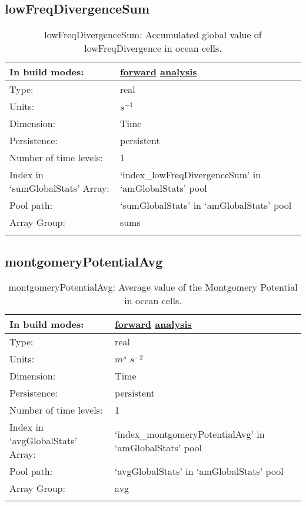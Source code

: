 \subsection[lowFreqDivergenceSum]{lowFreqDivergenceSum}
\label{subsec:var_sec_amGlobalStats_lowFreqDivergenceSum}
\begin{center}
\begin{longtable}{| p{2.0in} | p{4.0in} |}
        \hline 
        In build modes: & \hyperref[subsec:forward_var_tab_amGlobalStats]{forward} \hyperref[subsec:analysis_var_tab_amGlobalStats]{analysis} \\
        \hline 
        Type: & real \\
        \hline 
        Units: & $s^{-1}$ \\
        \hline 
        Dimension: & Time \\
        \hline 
        Persistence: & persistent \\
        \hline 
        Number of time levels: & 1 \\
        \hline 
		 Index in `sumGlobalStats' Array: & `index\_lowFreqDivergenceSum' in `amGlobalStats' pool \\
		 \hline 
            Pool path: & `sumGlobalStats' in `amGlobalStats' pool \\
		 \hline 
		 Array Group: & sums \\
		 \hline 
    \caption{lowFreqDivergenceSum: Accumulated global value of lowFreqDivergence in ocean cells.}
\end{longtable}
\end{center}
\subsection[montgomeryPotentialAvg]{montgomeryPotentialAvg}
\label{subsec:var_sec_amGlobalStats_montgomeryPotentialAvg}
\begin{center}
\begin{longtable}{| p{2.0in} | p{4.0in} |}
        \hline 
        In build modes: & \hyperref[subsec:forward_var_tab_amGlobalStats]{forward} \hyperref[subsec:analysis_var_tab_amGlobalStats]{analysis} \\
        \hline 
        Type: & real \\
        \hline 
        Units: & $m^s$ $s^{-2}$ \\
        \hline 
        Dimension: & Time \\
        \hline 
        Persistence: & persistent \\
        \hline 
        Number of time levels: & 1 \\
        \hline 
		 Index in `avgGlobalStats' Array: & `index\_montgomeryPotentialAvg' in `amGlobalStats' pool \\
		 \hline 
            Pool path: & `avgGlobalStats' in `amGlobalStats' pool \\
		 \hline 
		 Array Group: & avg \\
		 \hline 
    \caption{montgomeryPotentialAvg: Average value of the Montgomery Potential in ocean cells.}
\end{longtable}
\end{center}

